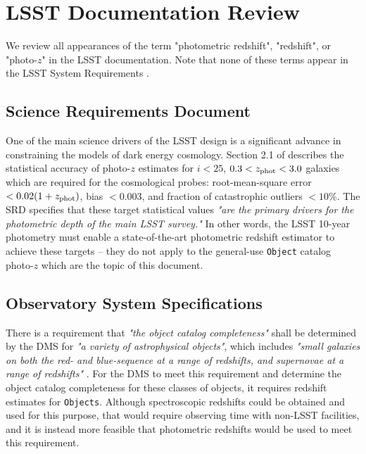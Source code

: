 \documentclass[DM,lsstdraft,toc]{lsstdoc}
\begin{document}
\clearpage
\section{LSST Documentation Review}\label{sec:docs}

We review all appearances of the term "photometric redshift", "redshift", or "photo-$z$" in the LSST documentation. Note that none of these terms appear in the LSST System Requirements .

\subsection{Science Requirements Document}\label{ssec:docs_srd}

One of the main science drivers of the LSST design is a significant advance in constraining the models of dark energy cosmology. 
Section 2.1 of  describes the statistical accuracy of photo-$z$ estimates for $i<25$, $0.3<z_{\rm phot}<3.0$ galaxies which are required for the cosmological probes: root-mean-square error $<0.02(1+z_{\rm phot})$, bias $<0.003$, and fraction of catastrophic outliers $<10\%$.
The SRD specifies that these target statistical values {\it "are the primary drivers for the photometric depth of the main LSST survey."} 
In other words, the LSST 10-year photometry must enable a state-of-the-art photometric redshift estimator to achieve these targets -- they do not apply to the general-use {\tt Object} catalog photo-$z$ which are the topic of this document.

\subsection{Observatory System Specifications}\label{ssec:docs_oss}

There is a requirement that {\it "the object catalog completeness"} shall be determined by the DMS for {\it "a variety of astrophysical objects"}, which includes {\it "small galaxies on both the red- and blue-sequence at a range of redshifts, and supernovae at a range of redshifts"} . 
For the DMS to meet this requirement and determine the object catalog completeness for these classes of objects, it requires redshift estimates for {\tt Objects}.
Although spectroscopic redshifts could be obtained and used for this purpose, that would require observing time with non-LSST facilities, and it is instead more feasible that photometric redshifts would be used to meet this requirement.
\end{document}
